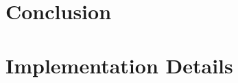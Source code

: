 \documentclass{article}
\begin{document}
\section{Conclusion}

%
%



\appendix

\section{Implementation Details}
\end{document}
